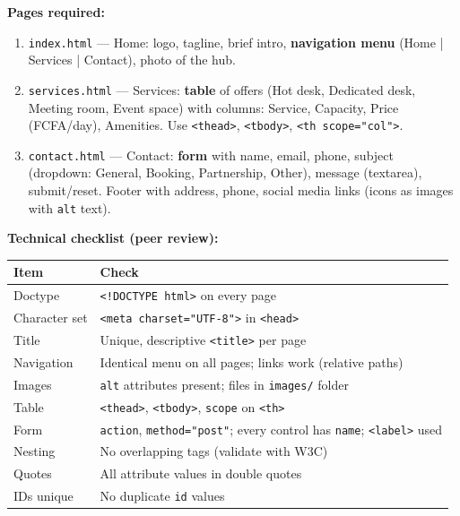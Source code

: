 \documentclass[11pt]{article}
\begin{document}
\begin{experience}
\textbf{Pages required:}
\begin{enumerate}
  \item \texttt{index.html} — Home: logo, tagline, brief intro, \textbf{navigation menu} (Home | Services | Contact), photo of the hub.
  \item \texttt{services.html} — Services: \textbf{table} of offers (Hot desk, Dedicated desk, Meeting room, Event space) with columns: Service, Capacity, Price (FCFA/day), Amenities.  Use \texttt{<thead>}, \texttt{<tbody>}, \texttt{<th scope="col">}.
  \item \texttt{contact.html} — Contact: \textbf{form} with name, email, phone, subject (dropdown: General, Booking, Partnership, Other), message (textarea), submit/reset.  Footer with address, phone, social media links (icons as images with \texttt{alt} text).
\end{enumerate}

\textbf{Technical checklist (peer review):}
\begin{center}
\begin{tabularx}{\linewidth}{|>{\hsize=0.5\hsize}X|>{\hsize=1.5\hsize}X|}
\hline
\rowcolor{popblueL}
\textbf{Item} & \textbf{Check} \\
\hline
Doctype & \texttt{<!DOCTYPE html>} on every page \\
\hline
Character set & \texttt{<meta charset="UTF-8">} in \texttt{<head>} \\
\hline
Title & Unique, descriptive \texttt{<title>} per page \\
\hline
Navigation & Identical menu on all pages; links work (relative paths) \\
\hline
Images & \texttt{alt} attributes present; files in \texttt{images/} folder \\
\hline
Table & \texttt{<thead>}, \texttt{<tbody>}, \texttt{scope} on \texttt{<th>} \\
\hline
Form & \texttt{action}, \texttt{method="post"}; every control has \texttt{name}; \texttt{<label>} used \\
\hline
Nesting & No overlapping tags (validate with W3C) \\
\hline
Quotes & All attribute values in double quotes \\
\hline
IDs unique & No duplicate \texttt{id} values \\
\hline
\end{tabularx}
\end{center}
\end{experience}
\end{document}
